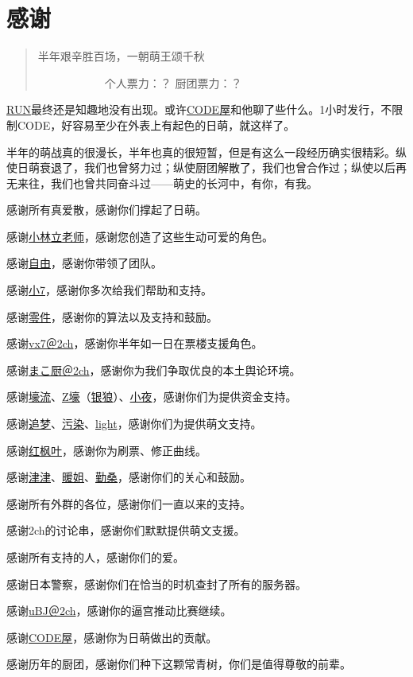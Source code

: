 \chapter{感谢}
\begin{quote}
半年艰辛胜百场，一朝萌王颂千秋

　　　　　　个人票力：？ 厨团票力：？
\end{quote}

\uline{RUN}最终还是知趣地没有出现。或许\uline{CODE屋}和他聊了些什么。1小时发行，不限制CODE，好容易至少在外表上有起色的日萌，就这样了。

半年的萌战真的很漫长，半年也真的很短暂，但是有这么一段经历确实很精彩。纵使日萌衰退了，我们也曾努力过；纵使厨团解散了，我们也曾合作过；纵使以后再无来往，我们也曾共同奋斗过——萌史的长河中，有你，有我。

感谢所有真爱散，感谢你们撑起了日萌。

感谢\uline{小林立老师}，感谢您创造了这些生动可爱的角色。

感谢\uline{自由}，感谢你带领了团队。

感谢\uline{小7}，感谢你多次给我们帮助和支持。

感谢\uline{零件}，感谢你的算法以及支持和鼓励。

感谢\uline{vx7＠2ch}，感谢你半年如一日在票楼支援角色。

感谢\uline{まこ厨＠2ch}，感谢你为我们争取优良的本土舆论环境。

感谢\uline{壕流}、\uline{Z壕}（\uline{银狼}）、\uline{小夜}，感谢你们为提供资金支持。

感谢\uline{追梦}、\uline{污染}、\uline{light}，感谢你们为提供萌文支持。

感谢\uline{红枫叶}，感谢你为刷票、修正曲线。

感谢\uline{津津}、\uline{暖姐}、\uline{勤桑}，感谢你们的关心和鼓励。

感谢所有外群的各位，感谢你们一直以来的支持。

感谢2ch的讨论串，感谢你们默默提供萌文支援。

感谢所有支持的人，感谢你们的爱。

感谢日本警察，感谢你们在恰当的时机查封了所有的服务器。

感谢\uline{uBJ＠2ch}，感谢你的逼宫推动比赛继续。

感谢\uline{CODE屋}，感谢你为日萌做出的贡献。

感谢历年的厨团，感谢你们种下这颗常青树，你们是值得尊敬的前辈。

